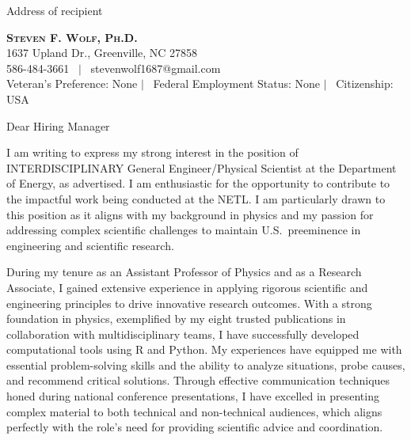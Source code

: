 \documentclass[12pt]{letter} %
\date{\today}
\begin{document}
\begin{letter}{ Address of recipient }
  \begin{center}
    \textbf{\Huge \scshape Steven F. Wolf, Ph.D.} \\ \vspace{1pt} 1637 Upland Dr., Greenville,
    NC 27858 \\ \vspace{1pt} 586-484-3661 \ $|$ \ stevenwolf1687@gmail.com \\
    \vspace{1pt} %
    Veteran's Preference: None $|$ \ Federal Employment Status: None $|$ \ Citizenship: USA \\
    \vspace{1pt}
  \end{center}
  \vfill

  \opening{Dear Hiring Manager}

  I am writing to express my strong interest in the position of INTERDISCIPLINARY General
  Engineer/Physical Scientist at the Department of Energy, as advertised. I am enthusiastic for
  the opportunity to contribute to the
  impactful work being conducted at the NETL. I am particularly drawn to this position
  as it aligns with my background in physics and my passion for addressing complex scientific
  challenges to maintain U.S.\ preeminence in engineering and scientific research.

  During my tenure as an Assistant Professor of Physics and as a Research Associate, I gained
  extensive experience in applying rigorous scientific and engineering principles to drive
  innovative research outcomes. With a strong foundation in physics, exemplified by my eight
  trusted publications in collaboration with multidisciplinary teams, I have successfully
  developed computational tools using R and Python. My experiences have equipped me with
  essential problem-solving skills and the ability to analyze situations, probe causes, and
  recommend critical solutions. Through effective communication techniques honed during
  national conference presentations, I have excelled in presenting complex material to both
  technical and non-technical audiences, which aligns perfectly with the role's need for
  providing scientific advice and coordination.


\end{letter}
\end{document}
